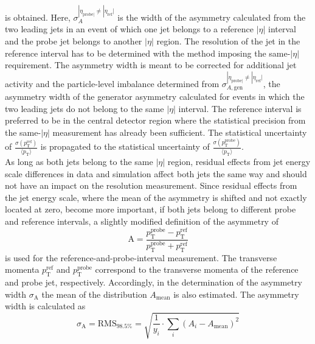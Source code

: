 is obtained. Here, $\sigma^{ |\eta_{\mathrm{probe}|} \neq |\eta_{\mathrm{ref}}|}_{A}$ is the width of the asymmetry calculated from the two leading jets in an event of which one jet belongs to a reference $|\eta|$ interval and the probe jet belongs to another $|\eta|$ region. The resolution of the jet in the reference interval has to be determined with the method imposing the same-$|\eta|$ requirement. The asymmetry width is meant to be corrected for additional jet activity and the particle-level imbalance determined from $\sigma^{|\eta_{\mathrm{probe}|} \neq |\eta_{\mathrm{ref}}|}_{A, \mathrm{gen}}$, \ie the asymmetry width of the generator asymmetry calculated for events in which the two leading jets do not belong to the same $|\eta|$ interval. The reference interval is preferred to be in the central detector region where the statistical precision from the same-$|\eta|$ measurement has already been sufficient. The statistical uncertainty of $\frac{\sigma (p^\mathrm{ref}_\mathrm{T})}{{\langle p_\mathrm{T} \rangle}}$ is propagated to the statistical uncertainty of $\frac{\sigma (p^\mathrm{probe}_\mathrm{T})}{\langle p_\mathrm{T} \rangle}$. \\
As long as both jets belong to the same $|\eta|$ region, residual effects from jet energy scale differences in data and simulation affect both jets the same way and should not have an impact on the resolution measurement. Since residual effects from the jet energy scale, where the mean of the asymmetry is shifted and not exactly located at zero, become more important, if both jets belong to different probe and reference intervals, a slightly modified definition of the asymmetry of
\begin{equation}
\label{eq:forwardasymmdef}
  \mathrm{A} = \frac{p^\mathrm{probe}_{\mathrm{T}} - p^\mathrm{ref}_{\mathrm{T}}}{p^\mathrm{probe}_{\mathrm{T}} + p^\mathrm{ref}_{\mathrm{T}}} 
 \end{equation}
is used for the reference-and-probe-interval measurement. The transverse momenta $p^\mathrm{ref}_{\mathrm{T}}$ and $p^\mathrm{probe}_{\mathrm{T}}$ correspond to the transverse momenta of the reference and probe jet, respectively. Accordingly, in the determination of the asymmetry width $\sigma_\mathrm{A}$ the mean of the distribution $A_\mathrm{mean}$ is also estimated. The asymmetry width is calculated as
\begin{equation}
\label{eq:forwardasymmwidthdef}
  \sigma_\mathrm{A} = \mathrm{RMS}_{98.5\%} = \sqrt{\frac{1}{y_i} \cdot \sum_{i}(A_i-A_\mathrm{mean})^2} 
 \end{equation}

